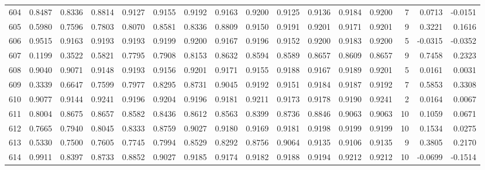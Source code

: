 \begin{tabular}{lrrrrrrrrrrrrrrr}
604 &      0.8487 &  0.8336 &  0.8814 &  0.9127 &  0.9155 &  0.9192 &  0.9163 &  0.9200 &  0.9125 &  0.9136 &   0.9184 &     0.9200 &      7 &                    0.0713 &                    -0.0151 \\
605 &      0.5980 &  0.7596 &  0.7803 &  0.8070 &  0.8581 &  0.8336 &  0.8809 &  0.9150 &  0.9191 &  0.9201 &   0.9171 &     0.9201 &      9 &                    0.3221 &                     0.1616 \\
606 &      0.9515 &  0.9163 &  0.9193 &  0.9193 &  0.9199 &  0.9200 &  0.9167 &  0.9196 &  0.9152 &  0.9200 &   0.9183 &     0.9200 &      5 &                   -0.0315 &                    -0.0352 \\
607 &      0.1199 &  0.3522 &  0.5821 &  0.7795 &  0.7908 &  0.8153 &  0.8632 &  0.8594 &  0.8589 &  0.8657 &   0.8609 &     0.8657 &      9 &                    0.7458 &                     0.2323 \\
608 &      0.9040 &  0.9071 &  0.9148 &  0.9193 &  0.9156 &  0.9201 &  0.9171 &  0.9155 &  0.9188 &  0.9167 &   0.9189 &     0.9201 &      5 &                    0.0161 &                     0.0031 \\
609 &      0.3339 &  0.6647 &  0.7599 &  0.7977 &  0.8295 &  0.8731 &  0.9045 &  0.9192 &  0.9151 &  0.9184 &   0.9187 &     0.9192 &      7 &                    0.5853 &                     0.3308 \\
610 &      0.9077 &  0.9144 &  0.9241 &  0.9196 &  0.9204 &  0.9196 &  0.9181 &  0.9211 &  0.9173 &  0.9178 &   0.9190 &     0.9241 &      2 &                    0.0164 &                     0.0067 \\
611 &      0.8004 &  0.8675 &  0.8657 &  0.8582 &  0.8436 &  0.8612 &  0.8563 &  0.8399 &  0.8736 &  0.8846 &   0.9063 &     0.9063 &     10 &                    0.1059 &                     0.0671 \\
612 &      0.7665 &  0.7940 &  0.8045 &  0.8333 &  0.8759 &  0.9027 &  0.9180 &  0.9169 &  0.9181 &  0.9198 &   0.9199 &     0.9199 &     10 &                    0.1534 &                     0.0275 \\
613 &      0.5330 &  0.7500 &  0.7605 &  0.7745 &  0.7994 &  0.8529 &  0.8292 &  0.8756 &  0.9064 &  0.9135 &   0.9106 &     0.9135 &      9 &                    0.3805 &                     0.2170 \\
614 &      0.9911 &  0.8397 &  0.8733 &  0.8852 &  0.9027 &  0.9185 &  0.9174 &  0.9182 &  0.9188 &  0.9194 &   0.9212 &     0.9212 &     10 &                   -0.0699 &                    -0.1514 \\

\end{tabular}

